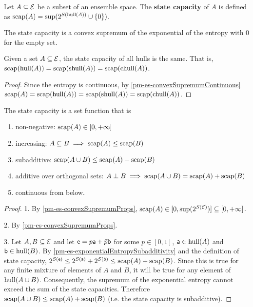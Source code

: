 \begin{mathSection}
\begin{defn}
	Let $A \subseteq \Ens$ be a subset of an ensemble space. The \textbf{state capacity} of $A$ is defined as $\scap(A) = \sup(2^{S(\hull(A))}\cup\{0\})$.
\end{defn}

\begin{coro}
	The state capacity is a convex supremum of the exponential of the entropy with $0$ for the empty set.
\end{coro}

\begin{coro}
	Given a set $A \subseteq \Ens$, the state capacity of all hulls is the same. That is, $\scap(\hull(A)) = \scap(\shull(A)) = \scap(\chull(A))$.
\end{coro}

\begin{proof}
	Since the entropy is continuous, by \ref{pm-es-convexSupremumContinuous} $\scap(A) = \scap(\hull(A)) = \scap(\shull(A)) = \scap(\chull(A))$.
\end{proof}

\begin{prop}
	The state capacity is a set function that is
	\begin{enumerate}
		\item non-negative: $\scap(A) \in [0, +\infty]$
		\item increasing: $A \subseteq B \implies \scap(A) \leq \scap(B)$
		\item subadditive: $\scap(A \cup B) \leq \scap(A) + \scap(B)$
		\item additive over orthogonal sets: $A \ortho B \implies \scap(A \cup B) = \scap(A) + \scap(B)$ 
		\item continuous from below.
	\end{enumerate}
\end{prop}

\begin{proof}
	1. By \ref{pm-es-convexSupremumProps}, $\scap(A) \in [0, \sup(2^{S(\Ens)})] \subseteq [0,+\infty]$. 
	
	2. By \ref{pm-es-convexSupremumProps}.
	
	3. Let $A, B \subseteq \Ens$ and let $\ens = p \ens[a] + \bar{p} \ens[b]$ for some $p \in [0,1]$, $\ens[a] \in \hull(A)$ and $\ens[b] \in \hull(B)$. By \ref{pm-es-exponentialEntropySubadditivity} and the definition of state capacity, $2^{S(\ens)} \leq 2^{S(\ens[a])} + 2^{S(\ens[b])} \leq \scap(A) + \scap(B)$. Since this is true for any finite mixture of elements of $A$ and $B$, it will be true for any element of $\hull(A \cup B)$. Consequently, the supremum of the exponential entropy cannot exceed the sum of the state capacities. Therefore $\scap(A \cup B) \leq \scap(A) + \scap(B)$ (i.e. the state capacity is subadditive).
	

\end{proof}
\end{mathSection}

